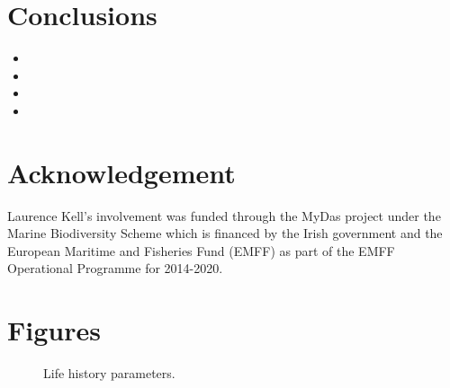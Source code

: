 \documentclass[12pt,doublespacing,a4paper]{ouparticle}
\begin{document}


\section{Conclusions}

\begin{itemize}
 \item 
 \item 
 \item 
 \item 
\end{itemize}

\section{Acknowledgement}

Laurence Kell's involvement was funded through the MyDas project under the Marine Biodiversity Scheme which is financed by the Irish government and the European Maritime and Fisheries Fund (EMFF) as part of the EMFF Operational Programme for 2014-2020. 

\clearpage




\clearpage
\section{Figures}

\newpage
\begin{figure}[h]
\centering

\caption{Life history parameters.}
\label{fig:cor}
\end{figure}
\end{document}
